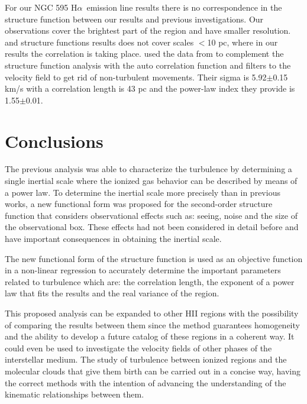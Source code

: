 \documentclass[fleqn,usenatbib, useAMS, a4paper]{mnras}
\newcommand\halpha{H${\alpha}$}
\begin{document}
For our NGC 595 \halpha\ emission line results there is no correspondence in the structure function between our results and previous investigations.
Our observations cover the brightest part of the region and have smaller resolution.
\citet{lagrois2009multi} and \citet{lagrois2011} structure functions results does not cover scales $<$10 pc, where in our results the correlation is taking place.
\citet{lagrois2011} used the data from \citet{lagrois2009multi} to complement the structure function analysis with the auto correlation function and filters to the velocity field to get rid of non-turbulent movements.
Their sigma is 5.92$\pm$0.15 km/s with a correlation length is 43 pc and the power-law index they provide is 1.55$\pm$0.01.


\section{Conclusions}\label{sec:conclusions}

The previous analysis was able to characterize the turbulence by determining a single inertial scale where the ionized gas behavior can be described by means of a power law.
To determine the inertial scale more precisely than in previous works, a new functional form was proposed for the second-order structure function that considers observational effects such as: seeing, noise and the size of the observational box.
These effects had not been considered in detail before and have important consequences in obtaining the inertial scale.

The new functional form of the structure function is used as an objective function in a non-linear regression to accurately determine the important parameters related to turbulence which are: the correlation length, the exponent of a power law that fits the results and the real variance of the region.

This proposed analysis can be expanded to other HII regions with the possibility of comparing the results between them since the method guarantees homogeneity and the ability to develop a future catalog of these regions in a coherent way.
It could even be used to investigate the velocity fields of other phases of the interstellar medium.
The study of turbulence between ionized regions and the molecular clouds that give them birth can be carried out in a concise way, having the correct methods with the intention of advancing the understanding of the kinematic relationships between them.
\end{document}
